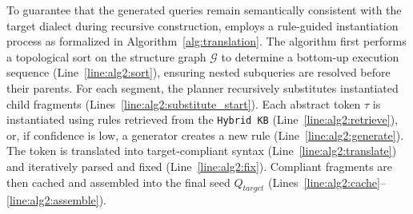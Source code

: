 \documentclass[sigconf,review,anonymous]{acmart}
\begin{document}
To guarantee that the generated queries remain semantically consistent with the target dialect during recursive construction, \tool{} employs a rule-guided instantiation process as formalized in Algorithm~\ref{alg:translation}. 
The algorithm first performs a topological sort on the structure graph $\mathcal{G}$ to determine a bottom-up execution sequence (Line~\ref{line:alg2:sort}), ensuring nested subqueries are resolved before their parents. For each segment, the planner recursively substitutes instantiated child fragments (Lines~\ref{line:alg2:substitute_start}). Each abstract token $\tau$ is instantiated using rules retrieved from the \texttt{Hybrid KB} (Line~\ref{line:alg2:retrieve}), or, if confidence is low, a generator creates a new rule (Line~\ref{line:alg2:generate}). The token is translated into target-compliant syntax (Line~\ref{line:alg2:translate}) and iteratively parsed and fixed (Line~\ref{line:alg2:fix}). Compliant fragments are then cached and assembled into the final seed $Q_{target}$ (Lines~\ref{line:alg2:cache}--\ref{line:alg2:assemble}).

\end{document}
